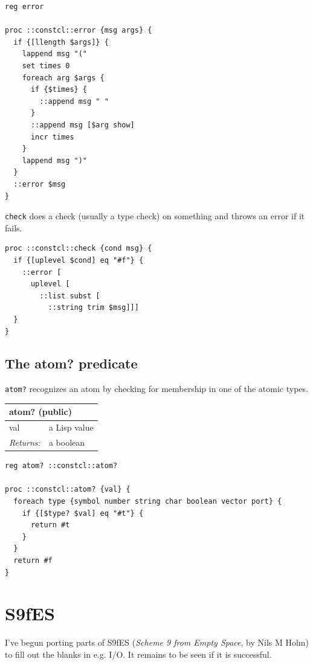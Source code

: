 \documentclass[twoside,9pt]{report}
\begin{document}
\noindent\makebox[\linewidth]{\rule{\linewidth}{0.4pt}}
\begin{lstlisting}
reg error
 
proc ::constcl::error {msg args} {
  if {[llength $args]} {
    lappend msg "("
    set times 0
    foreach arg $args {
      if {$times} {
        ::append msg " "
      }
      ::append msg [$arg show]
      incr times
    }
    lappend msg ")"
  }
  ::error $msg
}
\end{lstlisting}
\noindent\makebox[\linewidth]{\rule{\linewidth}{0.4pt}}

\texttt{check} does a check (usually a type check) on something and throws an error if it fails.

\noindent\makebox[\linewidth]{\rule{\linewidth}{0.4pt}}
\begin{lstlisting}
proc ::constcl::check {cond msg} {
  if {[uplevel $cond] eq "#f"} {
    ::error [
      uplevel [
        ::list subst [
          ::string trim $msg]]]
  }
}
\end{lstlisting}
\noindent\makebox[\linewidth]{\rule{\linewidth}{0.4pt}}
\section{The atom? predicate}
\label{the-atom?-predicate}

\texttt{atom?} recognizes an atom by checking for membership in one of the atomic types.

\begin{tabular}{ |l l| }
\hline
\multicolumn{2}{|l|}{atom? (public)} \\
\hline
val & a Lisp value \\
\textit{Returns:} & a boolean \\
\hline
\end{tabular}

\noindent\makebox[\linewidth]{\rule{\linewidth}{0.4pt}}
\begin{lstlisting}
reg atom? ::constcl::atom?
 
proc ::constcl::atom? {val} {
  foreach type {symbol number string char boolean vector port} {
    if {[$type? $val] eq "#t"} {
      return #t
    }
  }
  return #f
}
\end{lstlisting}
\noindent\makebox[\linewidth]{\rule{\linewidth}{0.4pt}}
\chapter{S9fES}
\label{s9fes}

I've begun porting parts of S9fES (\emph{Scheme 9 from Empty Space}, by Nils M Holm) to fill out the blanks in e.g. I/O. It remains to be seen if it is successful.
\end{document}
